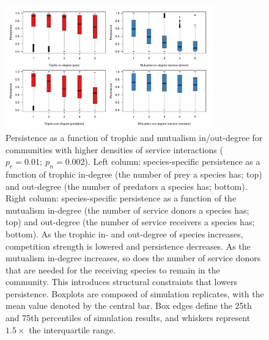 \documentclass[onecolumn,preprintnumbers,amsmath,amssymb,superscriptaddress]{revtex4-1}
\begin{document}
\begin{bibunit}
\begin{figure}[h!]
\centering
\includegraphics[width=0.8\textwidth]{fig_persistdegree_boxall2.pdf}
\caption{
Persistence as a function of trophic and mutualism in/out-degree for communities with higher densities of service interactions ($p_e = 0.01;~p_n = 0.002$).
Left column: species-specific persistence as a function of trophic in-degree (the number of prey a species has; top) and out-degree (the number of predators a species has; bottom).
Right column: species-specific persistence as a function of the mutualism in-degree (the number of service donors a species has; top) and out-degree (the number of service receivers a species has; bottom).
As the trophic in- and out-degree of species increases, competition strength is lowered and persistence decreases.
As the mutualism in-degree increases, so does the number of service donors that are needed for the receiving species to remain in the community. This introduces structural constraints that lowers persistence.
Boxplots are composed of simulation replicates, with the mean value denoted by the central bar.
Box edges define the 25th and 75th percentiles of simulation results, and whiskers represent $1.5\times$ the interquartile range.}
\label{fig:degree}
\end{figure}



\end{bibunit}
\end{document}
